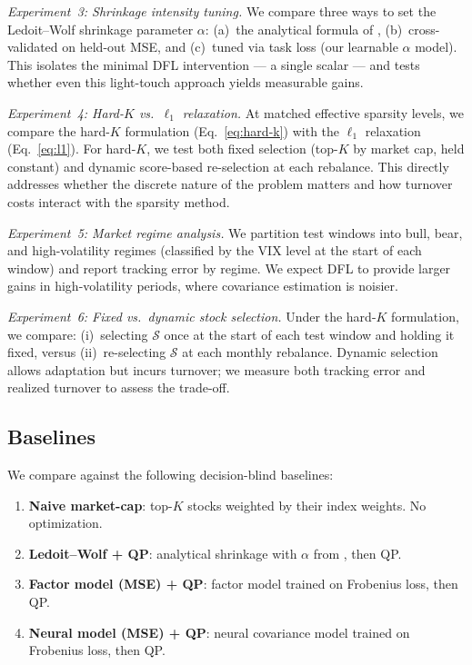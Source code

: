 \documentclass[11pt]{article}
\begin{document}
\textit{Experiment~3: Shrinkage intensity tuning.}
We compare three ways to set the Ledoit--Wolf shrinkage parameter $\alpha$: (a)~the analytical formula of \citet{ledoit2004well}, (b)~cross-validated on held-out MSE, and (c)~tuned via task loss (our learnable $\alpha$ model). This isolates the minimal DFL intervention --- a single scalar --- and tests whether even this light-touch approach yields measurable gains.

\textit{Experiment~4: Hard-$K$ vs.\ $\ell_1$ relaxation.}
At matched effective sparsity levels, we compare the hard-$K$ formulation (Eq.~\ref{eq:hard-k}) with the $\ell_1$ relaxation (Eq.~\ref{eq:l1}). For hard-$K$, we test both fixed selection (top-$K$ by market cap, held constant) and dynamic score-based re-selection at each rebalance. This directly addresses whether the discrete nature of the problem matters and how turnover costs interact with the sparsity method.

\textit{Experiment~5: Market regime analysis.}
We partition test windows into bull, bear, and high-volatility regimes (classified by the VIX level at the start of each window) and report tracking error by regime. We expect DFL to provide larger gains in high-volatility periods, where covariance estimation is noisier.

\textit{Experiment~6: Fixed vs.\ dynamic stock selection.}
Under the hard-$K$ formulation, we compare: (i)~selecting $\mathcal{S}$ once at the start of each test window and holding it fixed, versus (ii)~re-selecting $\mathcal{S}$ at each monthly rebalance. Dynamic selection allows adaptation but incurs turnover; we measure both tracking error and realized turnover to assess the trade-off.

\subsection{Baselines}

We compare against the following decision-blind baselines:
\begin{enumerate}[nosep]
  \item \textbf{Naive market-cap}: top-$K$ stocks weighted by their index weights. No optimization.
  \item \textbf{Ledoit--Wolf + QP}: analytical shrinkage with $\alpha$ from \citet{ledoit2004well}, then QP.
  \item \textbf{Factor model (MSE) + QP}: factor model trained on Frobenius loss, then QP.
  \item \textbf{Neural model (MSE) + QP}: neural covariance model trained on Frobenius loss, then QP.
\end{enumerate}
\end{document}

